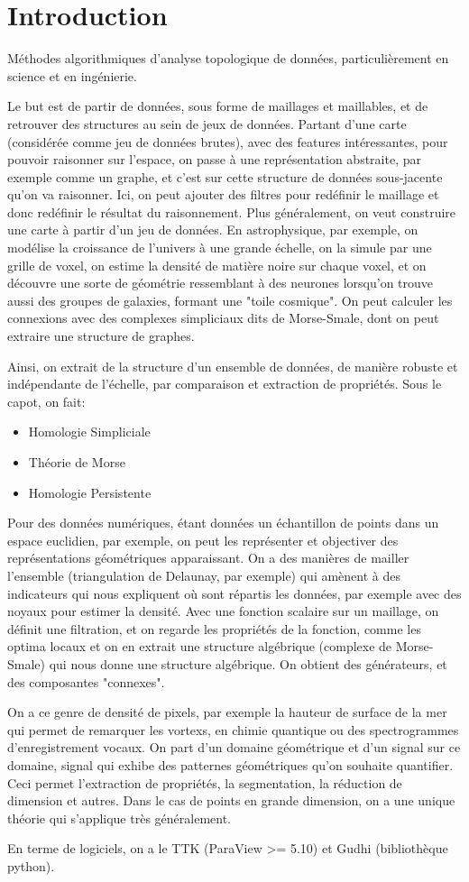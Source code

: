 \section*{Introduction}
Méthodes algorithmiques d'analyse topologique de données, particulièrement en science et en ingénierie.

Le but est de partir de données, sous forme de maillages et maillables, et de retrouver des
structures au sein de jeux de données.
Partant d'une carte (considérée comme jeu de données brutes), avec des features intéressantes,
pour pouvoir raisonner sur l'espace, on passe à une représentation abstraite, par exemple
comme un graphe, et c'est sur cette structure de données sous-jacente qu'on va raisonner.
Ici, on peut ajouter des filtres pour redéfinir le maillage et donc redéfinir le résultat
du raisonnement.
Plus généralement, on veut construire une carte à partir d'un jeu de données.
En astrophysique, par exemple, on modélise la croissance de l'univers à une grande échelle, on
la simule par une grille de voxel, on estime la densité de matière noire sur chaque voxel,
et on découvre une sorte de géométrie ressemblant à des neurones lorsqu'on trouve aussi des groupes
de galaxies, formant une "toile cosmique".
On peut calculer les connexions avec des complexes simpliciaux dits de Morse-Smale, dont on peut extraire
une structure de graphes.

Ainsi, on extrait de la structure d'un ensemble de données, de manière robuste et indépendante de l'échelle, par comparaison et extraction de propriétés.
Sous le capot, on fait:
\begin{itemize}
	\item Homologie Simpliciale
	\item Théorie de Morse
	\item Homologie Persistente
\end{itemize}

Pour des données numériques, étant données un échantillon de points dans un espace euclidien, par exemple, on peut les représenter et objectiver des représentations géométriques apparaissant.
On a des manières de mailler l'ensemble (triangulation de Delaunay, par exemple) qui amènent à des
indicateurs qui nous expliquent où sont répartis les données, par exemple avec des noyaux pour estimer la
densité.
Avec une fonction scalaire sur un maillage, on définit une filtration, et on regarde les propriétés de la fonction, comme les optima locaux et on en extrait une structure algébrique (complexe de Morse-Smale) qui nous donne une structure algébrique.
On obtient des générateurs, et des composantes "connexes".

On a ce genre de densité de pixels, par exemple la hauteur de surface de la mer qui permet
de remarquer les vortexs, en chimie quantique ou des spectrogrammes d'enregistrement vocaux.
On part d'un domaine géométrique et d'un signal sur ce domaine, signal qui exhibe des patternes géométriques
qu'on souhaite quantifier.
Ceci permet l'extraction de propriétés, la segmentation, la réduction de dimension et autres.
Dans le cas de points en grande dimension, on a une unique théorie qui s'applique très généralement.

En terme de logiciels, on a le TTK (ParaView >= 5.10) et Gudhi (bibliothèque python).


